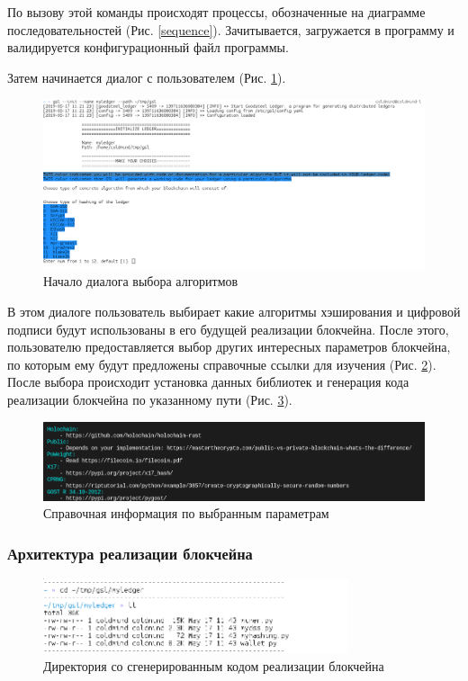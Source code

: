 По вызову этой команды происходят процессы, обозначенные на диаграмме
последовательностей (Рис. \ref{sequence}). Зачитывается, загружается в
программу и валидируется конфигурационный файл программы.

\newpage

Затем начинается диалог с пользователем (Рис. \ref{dialog}).
\begin{figure}[h]
    \centering
    \includegraphics[width=\textwidth]{images/dialog_start}
    \caption{Начало диалога выбора алгоритмов}\label{dialog}
\end{figure}

В этом диалоге пользователь выбирает какие алгоритмы хэширования и цифровой
подписи будут использованы в его будущей реализации блокчейна. После этого,
пользователю предоставляется выбор других интересных параметров блокчейна, по
которым ему будут предложены справочные ссылки для изучения (Рис. \ref{sprav}).
После выбора происходит установка данных библиотек и генерация кода реализации
блокчейна по указанному пути (Рис. \ref{ll}).

\begin{figure}[h]
    \centering
    \includegraphics[width=\textwidth]{images/spravochno}
    \caption{Справочная информация по выбранным параметрам}\label{sprav}
\end{figure}

\subsubsection{Архитектура реализации блокчейна}
\begin{figure}[h]
    \centering
    \includegraphics[width=0.8\textwidth]{images/ledger_ll}
    \caption{Директория со сгенерированным кодом реализации блокчейна}\label{ll}
\end{figure}

